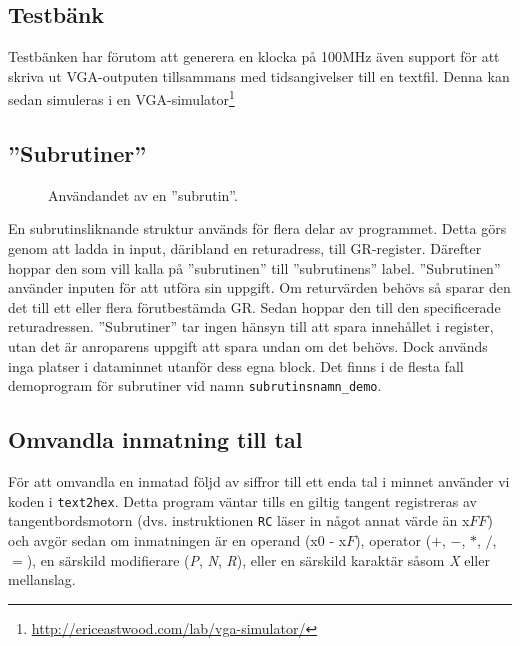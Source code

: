 \documentclass[]{article}
\begin{document}
\subsection{Testbänk}
Testbänken har förutom att generera en klocka på 100MHz även support för att skriva ut VGA-outputen tillsammans med tidsangivelser till en textfil. Denna kan sedan simuleras i en VGA-simulator\footnote{\href{http://ericeastwood.com/lab/vga-simulator/}{\url{http://ericeastwood.com/lab/vga-simulator/}}}

\newpage
\subsection{''Subrutiner''}
\begin{figure}[h!]
	\caption{Användandet av en ''subrutin''. }
\end{figure}
\noindent
En subrutinsliknande struktur används för flera delar av programmet. Detta görs genom att ladda in input, däribland en returadress, till GR-register. Därefter hoppar den som vill kalla på ''subrutinen'' till ''subrutinens'' label. ''Subrutinen'' använder inputen för att utföra sin uppgift. Om returvärden behövs så sparar den det till ett eller flera förutbestämda GR. Sedan hoppar den till den specificerade returadressen. ''Subrutiner'' tar ingen hänsyn till att spara innehållet i register, utan det är anroparens uppgift att spara undan om det behövs. Dock används inga platser i dataminnet utanför dess egna block. Det finns i de flesta fall demoprogram för subrutiner vid namn \texttt{subrutinsnamn\_demo}.

\subsection{Omvandla inmatning till tal}\label{sec:text2hex}
För att omvandla en inmatad följd av siffror till ett enda tal i minnet använder vi koden i \texttt{text2hex}. Detta program väntar tills en giltig tangent registreras av tangentbordsmotorn (dvs. instruktionen \texttt{RC} läser in något annat värde än x$FF$) och avgör sedan om inmatningen är en operand (x$0$ - x$F$), operator ($+$, $-$, $*$, $/$, $=$), en särskild modifierare (\textit{P}, \textit{N}, \textit{R}), eller en särskild karaktär såsom \textit{X} eller mellanslag.
\end{document}
